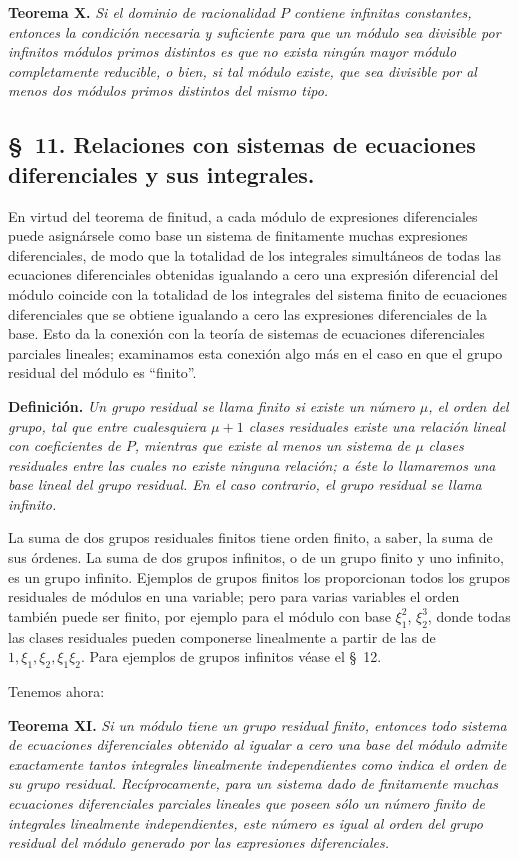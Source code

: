 \textbf{Teorema X.} \emph{Si el dominio de racionalidad $P$ contiene infinitas constantes, entonces la condición necesaria y suficiente para que un módulo sea divisible por infinitos módulos primos distintos es que no exista ningún mayor módulo completamente reducible, o bien, si tal módulo existe, que sea divisible por al menos dos módulos primos distintos del mismo tipo.}

\subsection*{\S~11. Relaciones con sistemas de ecuaciones diferenciales y sus integrales.}

En virtud del teorema de finitud, a cada módulo de expresiones diferenciales puede asignársele como base un sistema de finitamente muchas expresiones diferenciales, de modo que la totalidad de los integrales simultáneos de todas las ecuaciones diferenciales obtenidas igualando a cero una expresión diferencial del módulo coincide con la totalidad de los integrales del sistema finito de ecuaciones diferenciales que se obtiene igualando a cero las expresiones diferenciales de la base. Esto da la conexión con la teoría de sistemas de ecuaciones diferenciales parciales lineales; examinamos esta conexión algo más en el caso en que el grupo residual del módulo es ``finito''.

\textbf{Definición.} \emph{Un grupo residual se llama finito si existe un número $\mu$, el orden del grupo, tal que entre cualesquiera $\mu+1$ clases residuales existe una relación lineal con coeficientes de $P$, mientras que existe al menos un sistema de $\mu$ clases residuales entre las cuales no existe ninguna relación; a éste lo llamaremos una base lineal del grupo residual. En el caso contrario, el grupo residual se llama infinito.}

La suma de dos grupos residuales finitos tiene orden finito, a saber, la suma de sus órdenes. La suma de dos grupos infinitos, o de un grupo finito y uno infinito, es un grupo infinito. Ejemplos de grupos finitos los proporcionan todos los grupos residuales de módulos en una variable; pero para varias variables el orden también puede ser finito, por ejemplo para el módulo con base $\xi_1^2$, $\xi_2^3$, donde todas las clases residuales pueden componerse linealmente a partir de las de $1,\xi_1,\xi_2,\xi_1\xi_2$. Para ejemplos de grupos infinitos véase el \S~12.

Tenemos ahora:

\textbf{Teorema XI.} \emph{Si un módulo tiene un grupo residual finito, entonces todo sistema de ecuaciones diferenciales obtenido al igualar a cero una base del módulo admite exactamente tantos integrales linealmente independientes como indica el orden de su grupo residual. Recíprocamente, para un sistema dado de finitamente muchas ecuaciones diferenciales parciales lineales que poseen sólo un número finito de integrales linealmente independientes, este número es igual al orden del grupo residual del módulo generado por las expresiones diferenciales.}


